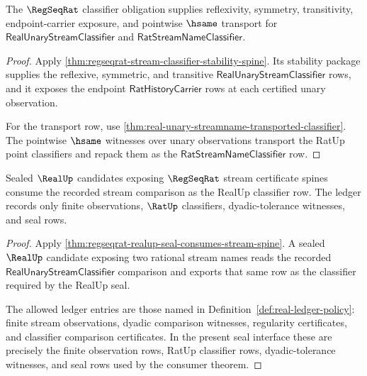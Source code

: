 \begin{theorem}
\label{thm:regseqrat-obligation-classifier}
The $\RegSeqRat$ classifier obligation supplies reflexivity, symmetry,
transitivity, endpoint-carrier exposure, and pointwise $\hsame$ transport for
$\mathsf{RealUnaryStreamClassifier}$ and
$\mathsf{RatStreamNameClassifier}$.
\end{theorem}
\begin{proof}
Apply \autoref{thm:regseqrat-stream-classifier-stability-spine}. Its stability
package supplies the reflexive, symmetric, and transitive
$\mathsf{RealUnaryStreamClassifier}$ rows, and it exposes the endpoint
$\mathsf{RatHistoryCarrier}$ rows at each certified unary observation.

For the transport row, use
\autoref{thm:real-unary-streamname-transported-classifier}. The pointwise
$\hsame$ witnesses over unary observations transport the RatUp point
classifiers and repack them as the
$\mathsf{RatStreamNameClassifier}$ row.
\end{proof}

\begin{theorem}
\label{thm:regseqrat-obligation-seal-interface}
Sealed $\RealUp$ candidates exposing $\RegSeqRat$ stream certificate spines
consume the recorded stream comparison as the RealUp classifier row. The
ledger records only finite observations, $\RatUp$ classifiers,
dyadic-tolerance witnesses, and seal rows.
\end{theorem}
\begin{proof}
Apply \autoref{thm:regseqrat-realup-seal-consumes-stream-spine}. A sealed
$\RealUp$ candidate exposing two rational stream names reads the recorded
$\mathsf{RealUnaryStreamClassifier}$ comparison and exports that same row as
the classifier required by the RealUp seal.

The allowed ledger entries are those named in
Definition~\ref{def:real-ledger-policy}: finite stream observations, dyadic
comparison witnesses, regularity certificates, and classifier comparison
certificates. In the present seal interface these are precisely the finite
observation rows, RatUp classifier rows, dyadic-tolerance witnesses, and seal
rows used by the consumer theorem.
\end{proof}
